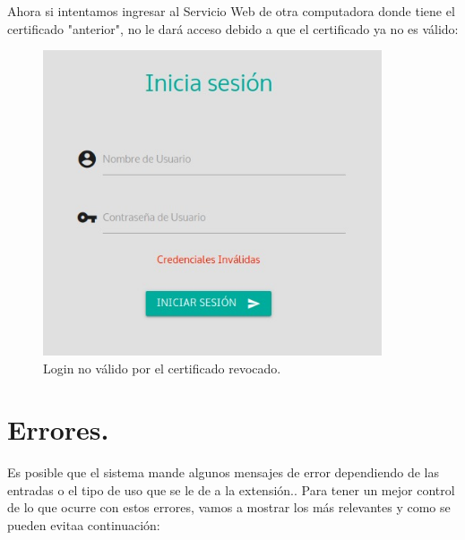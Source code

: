 \documentclass[12pt, a4paper, titlepage]{report}
\begin{document}
    	Ahora si intentamos ingresar al Servicio Web de otra computadora donde tiene el certificado "anterior", no le dará acceso debido a que el certificado ya no es válido: 
    	\begin{figure}[H]
    		\begin{center}	
    		\includegraphics[width=10cm]{imagenes/Revocacion/loginNoValido.jpg}
    		\caption{Login no válido por el certificado revocado.}
    		\label{fig:loginNoValido}
    		\end{center}
    	\end{figure}
    
    
    \section{Errores.}
    Es posible que el sistema mande algunos mensajes de error dependiendo de las entradas o el tipo de uso que se le de a la extensión.. Para tener un mejor control de lo que ocurre con estos errores, vamos a mostrar los más relevantes y como se pueden evitaa continuación: 
    
\end{document}
